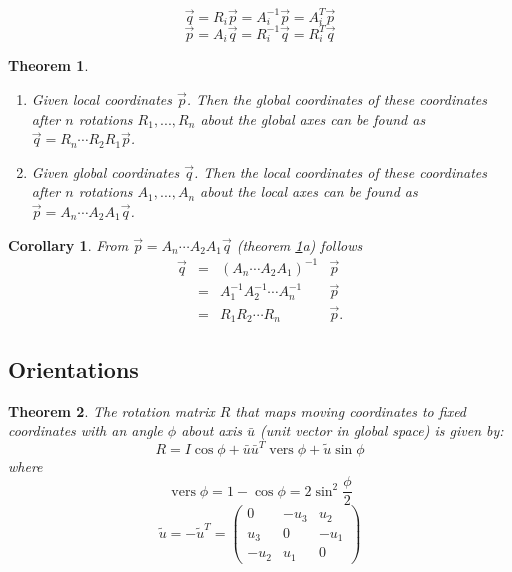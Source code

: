 \documentclass{article}
\newtheorem{theorem}{Theorem}[section]
\newtheorem{corollary}{Corollary}[section]
\theoremstyle{definition}
\DeclareMathOperator{\vers}{vers}
\begin{document}
\begin{equation*}
\vec{q} = R_i \vec{p} = A_i^{-1}\vec{p} = A_i^T \vec{p}
\end{equation*}
\begin{equation*}
\vec{p} = A_i \vec{q} = R_i^{-1}\vec{q} = R_i^T \vec{q}
\end{equation*}

\begin{theorem}\label{thm_succesive-rotation}\hfill
\begin{enumerate}[{(a)}]
\item Given local coordinates $\vec{p}$. Then the global coordinates of these coordinates after $n$ rotations $R_1, ..., R_n$ about the global axes can be found as $\vec{q} = R_n \cdots R_2 R_1 \vec{p}$.\newline
\item Given global coordinates $\vec{q}$. Then the local coordinates of these coordinates after $n$ rotations $A_1, ..., A_n$ about the local axes can be found as $\vec{p} = A_n \cdots A_2 A_1 \vec{q}$.\newline
\end{enumerate}
\end{theorem}

\begin{corollary}
From $\vec{p} = A_n \cdots A_2 A_1 \vec{q}$ (theorem \ref{thm_succesive-rotation}a) follows \newline
\begin{equation*}
\begin{array}{lcrl}
\vec{q} & = & \left( A_n \cdots A_2 A_1 \right)^{-1} & \vec{p} \\
& = & A_1^{-1} A_2^{-1} \cdots A_n^{-1} & \vec{p} \\
& = & R_1 R_2 \cdots R_n & \vec{p}.
\end{array}
\end{equation*}
\end{corollary}

\subsection{Orientations}
\begin{theorem}
The rotation matrix $R$ that maps moving coordinates to fixed coordinates with an angle $\phi$ about axis $\bar{u}$ (unit vector in global space) is given by:\newline
\begin{equation*}
R = I \cos \phi + \bar{u}\bar{u}^T \vers \phi + \tilde{u} \sin \phi
\end{equation*}
where
\begin{equation*}
\vers \phi = 1 - \cos \phi = 2 \sin^2 \frac{\phi}{2}
\end{equation*}
\begin{equation*}
\tilde{u} = -\tilde{u}^T = \begin{pmatrix}
0 & -u_3 & u_2 \\
u_3 & 0 & -u_1 \\
-u_2 & u_1 & 0
\end{pmatrix}
\end{equation*}
\end{theorem}
\end{document}
